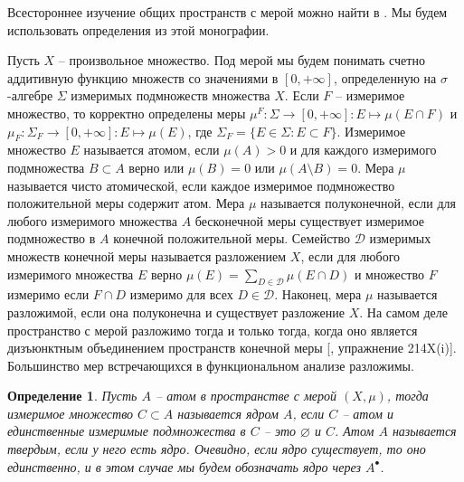 \documentclass[12pt]{article}
\numberwithin{equation}{subsection}
\theoremstyle{plain}
\newtheorem{definition}{Определение}
\begin{document}
\begin{fulltext}
    Всестороннее изучение общих пространств с мерой можно найти в \cite{FremMeasTh2}. Мы будем использовать определения из этой монографии.

    Пусть $X$ -- произвольное множество. Под мерой мы будем понимать счетно аддитивную функцию множеств со значениями в $[0,+\infty]$, определенную на $\sigma$-алгебре $\Sigma$ измеримых подмножеств множества $X$. Если $F$ -- измеримое множество, то корректно определены меры $\mu^F:\Sigma\to[0,+\infty]:E\mapsto \mu(E\cap F)$ и $\mu_F:\Sigma_F\to[0,+\infty]: E\mapsto \mu(E)$, где $\Sigma_F=\{E\in\Sigma:E\subset F\}$. Измеримое множество $E$ называется атомом, если $\mu(A)>0$ и для каждого измеримого подмножества $B\subset A$ верно или $\mu(B)=0$ или $\mu(A\setminus B)=0$. Мера $\mu$ называется чисто атомической, если каждое измеримое подмножество положительной меры содержит атом. Мера $\mu$ называется полуконечной, если для любого измеримого множества $A$ бесконечной меры существует измеримое подмножество в $A$ конечной положительной меры. Семейство $\mathcal{D}$ измеримых множеств конечной меры называется разложением $X$, если для любого измеримого множества $E$ верно $\mu(E)=\sum_{D\in\mathcal{D}}\mu(E\cap D)$ и множество $F$ измеримо если $F\cap D$ измеримо для всех $D\in\mathcal{D}$. Наконец, мера $\mu$ называется разложимой, если она полуконечна и существует разложение $X$. На самом деле пространство с мерой разложимо тогда и только тогда, когда оно является дизъюнктным объединением пространств конечной меры [\cite{FremMeasTh2}, упражнение 214X(i)]. Большинство мер встречающихся в функциональном анализе разложимы.

    \begin{definition}\label{AtomCore} Пусть $A$ -- атом в пространстве с мерой $(X,\mu)$, тогда измеримое множество $C\subset A$ называется ядром $A$, если $C$ -- атом и единственные измеримые подмножества в $C$ -- это $\varnothing$ и $C$. Атом $A$ называется твердым, если у него есть ядро. Очевидно, если ядро существует, то оно единственно, и в этом случае мы будем обозначать ядро через $A^\bullet$.
    \end{definition}


\end{fulltext}
\end{document}
